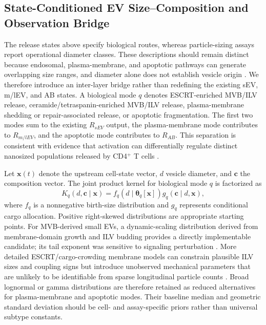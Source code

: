 \subsection*{State-Conditioned EV Size--Composition and Observation Bridge}

The release states above specify biological routes, whereas particle-sizing assays report operational diameter classes. These descriptions should remain distinct because endosomal, plasma-membrane, and apoptotic pathways can generate overlapping size ranges, and diameter alone does not establish vesicle origin \cite{welsh2024minimal}. We therefore introduce an inter-layer bridge rather than redefining the existing sEV, m/lEV, and AB states. A biological mode $q$ denotes ESCRT-enriched MVB/ILV release, ceramide/tetraspanin-enriched MVB/ILV release, plasma-membrane shedding or repair-associated release, or apoptotic fragmentation. The first two modes sum to the existing $R_{sEV}$ output, the plasma-membrane mode contributes to $R_{m/lEV}$, and the apoptotic mode contributes to $R_{AB}$. This separation is consistent with evidence that activation can differentially regulate distinct nanosized populations released by CD4$^+$ T cells \cite{vanDerVlist2012activation}.

Let $\mathbf{x}(t)$ denote the upstream cell-state vector, $d$ vesicle diameter, and $\mathbf{c}$ the composition vector. The joint product kernel for biological mode $q$ is factorized as
\begin{equation*}
K_q(d,\mathbf{c}\mid\mathbf{x})
=f_q\!\left(d\mid\boldsymbol{\theta}_q[\mathbf{x}]\right)
g_q(\mathbf{c}\mid d,\mathbf{x}),
\end{equation*}
where $f_q$ is a nonnegative birth-size distribution and $g_q$ represents conditional cargo allocation. Positive right-skewed distributions are appropriate starting points. For MVB-derived small EVs, a dynamic-scaling distribution derived from membrane-domain growth and ILV budding provides a directly implementable candidate; its tail exponent was sensitive to signaling perturbation \cite{paulaitis2018dynamic}. More detailed ESCRT/cargo-crowding membrane models can constrain plausible ILV sizes and coupling signs but introduce unobserved mechanical parameters that are unlikely to be identifiable from sparse longitudinal particle counts \cite{liese2020protein}. Broad lognormal or gamma distributions are therefore retained as reduced alternatives for plasma-membrane and apoptotic modes. Their baseline median and geometric standard deviation should be cell- and assay-specific priors rather than universal subtype constants.

